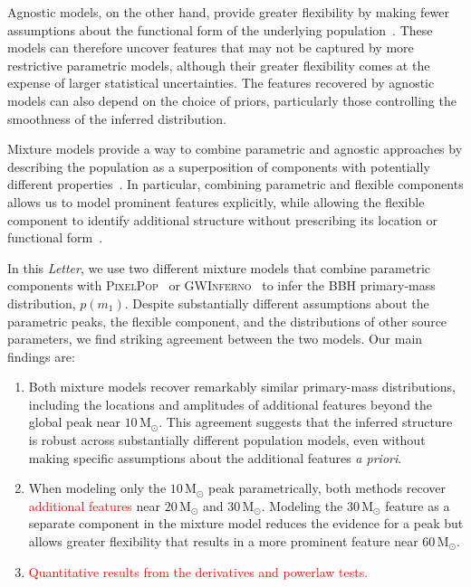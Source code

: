 \documentclass[twocolumn,twocolappendix,linenumbers]{aastex631}
\newcommand{\PixelPop}{\textsc{PixelPop}\xspace}
\newcommand{\Gwinferno}{\textsc{GWInferno}\xspace}
\newcommand{\Msun}{\ensuremath{\mathrm{M}_\odot}\xspace}
\begin{document}
Agnostic models, on the other hand, provide greater flexibility by making fewer assumptions about the functional form of the underlying population~\citep[e.g.,][]{Heinzel:2024jlc,Edelman:2021zkw,Edelman:2022ydv,Godfrey:2023oxb,Golomb:2022bon,Tiwari:2020vym,Rinaldi:2021bhm,Callister:2023tgi,Alvarez-Lopez:2025ltt,Ray:2024hos, Ray:2026qer}.
These models can therefore uncover features that may not be captured by more restrictive parametric models, although their greater flexibility comes at the expense of larger statistical uncertainties.
The features recovered by agnostic models can also depend on the choice of priors, particularly those controlling the smoothness of the inferred distribution.

Mixture models provide a way to combine parametric and agnostic approaches by describing the population as a superposition of components with potentially different properties~\citep[e.g.,][]{Tiwari:2020vym,Godfrey:2023oxb,LIGOScientific:2025pvj,LIGOScientific:2026ctl,Rinaldi:2025evs,Alvarez-Lopez:inprep}.
In particular, combining parametric and flexible components allows us to model prominent features explicitly, while allowing the flexible component to identify additional structure without prescribing its location or functional form~\citep{Godfrey:2023oxb,Alvarez-Lopez:2026ymo,Alvarez-Lopez:inprep}.

In this \emph{Letter}, we use two different mixture models that combine parametric components with \PixelPop~\citep{Alvarez-Lopez:inprep} or \Gwinferno~\citep{Edelman:2022ydv,Godfrey:2023oxb} to infer the \ac{BBH} primary-mass distribution, $p(m_1)$.
Despite substantially different assumptions about the parametric peaks, the flexible component, and the distributions of other source parameters, we find striking agreement between the two models. Our main findings are:

\begin{enumerate}
    \item Both mixture models recover remarkably similar primary-mass distributions, including the locations and amplitudes of additional features beyond the global peak near $10\,\Msun$.
    This agreement suggests that the inferred structure is robust across substantially different population models, even without making specific assumptions about the additional features \textit{a priori}.
    \item When modeling only the $10\,\Msun$ peak parametrically, both methods recover \textcolor{red}{additional features} near $20\,\Msun$ and $30\,\Msun$.
    Modeling the $30\,\Msun$ feature as a separate component in the mixture model reduces the evidence for a peak but allows greater flexibility that results in a more prominent feature near $60\,\Msun$.
    \item \textcolor{red}{Quantitative results from the derivatives and powerlaw tests.}
\end{enumerate}
 
\end{document}
